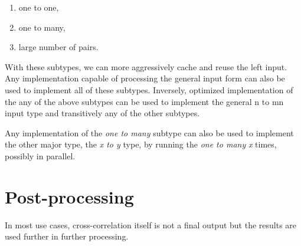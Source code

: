 \begin{enumerate}
	\item one to one,
	\item one to many,
	\item large number of pairs.
\end{enumerate}

With these subtypes, we can more aggressively cache and reuse the left input. Any implementation capable of processing the general input form can also be used to implement all of these subtypes.
Inversely, optimized implementation of the any of the above subtypes can be used to implement the general n to mn input type and transitively any of the other subtypes.

Any implementation of the \textit{one to many} subtype can also be used to implement the other major type, the \textit{x to y} type, by running the \textit{one to many} \textit{x} times, possibly in parallel.




\section{Post-processing}

In most use cases, cross-correlation itself is not a final output but the results are used further in further processing.

